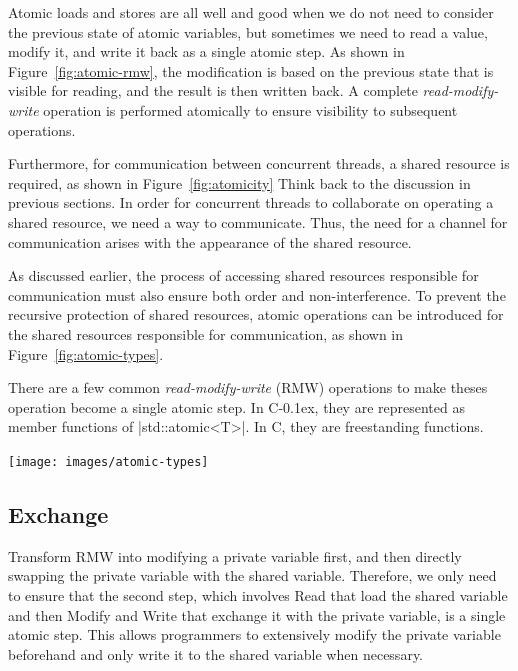 \documentclass[fontsize=10pt, oneside]{scrartcl}
\newcommand{\cplusplus}[1]{C\kern-0.1ex\raisebox{0.15ex}{\texttt{++}}}
\newcommand{\clang}[1]{C}
\newcommand{\fig}[1]{Figure~\ref{#1}}
\newcommand{\introduce}[1]{\textit{#1}}
\begin{document}
Atomic loads and stores are all well and good when we do not need to consider the previous state of atomic variables, but sometimes we need to read a value, modify it, and write it back as a single atomic step.
As shown in \fig{fig:atomic-rmw}, the modification is based on the previous state that is visible for reading, and the result is then written back.
A complete \introduce{read-modify-write} operation is performed atomically to ensure visibility to subsequent operations.
  
Furthermore, for communication between concurrent threads, a shared resource is required, as shown in \fig{fig:atomicity} 
Think back to the discussion in previous sections. 
In order for concurrent threads to collaborate on operating a shared resource, we need a way to communicate. 
Thus, the need for a channel for communication arises with the appearance of the shared resource.

As discussed earlier, the process of accessing shared resources responsible for communication must also ensure both order and non-interference. 
To prevent the recursive protection of shared resources, 
atomic operations can be introduced for the shared resources responsible for communication, as shown in \fig{fig:atomic-types}.

There are a few common \introduce{read-modify-write} (\textsc{RMW}) operations to make theses operation become a single atomic step.
In \cplusplus{}, they are represented as member functions of \cpp|std::atomic<T>|.
In \clang{}, they are freestanding functions.

\texttt{[image: images/atomic-types]}
\label{fig:atomic-types}

\subsection{Exchange}
\label{exchange}
Transform \textsc{RMW} into modifying a private variable first, 
and then directly swapping the private variable with the shared variable. 
Therefore, we only need to ensure that the second step, 
which involves Read that load the shared variable and then Modify and Write that exchange it with the private variable, 
is a single atomic step.
This allows programmers to extensively modify the private variable beforehand and only write it to the shared variable when necessary. 
\end{document}
